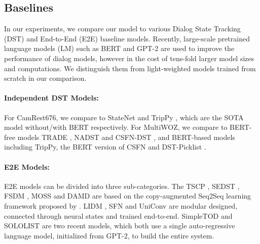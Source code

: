 \documentclass[11pt,a4paper]{article}
\begin{document}
\subsection{Baselines}
In our experiments, we compare our model to various Dialog State Tracking (DST) and End-to-End (E2E) baseline models. 
	Recently, large-scale pretrained language models (LM) such as BERT \cite{devlin2019bert} and GPT-2 \cite{radford2019gpt2} are used to improve the performance of dialog models, however in the cost of tens-fold larger model sizes and computations. We distinguish them from light-weighted models trained from scratch in our comparison. 
	
	\paragraph{Independent DST Models:}
	For CamRest676, we compare to StateNet \cite{ren2018towards} and TripPy \cite{heck2020trippy}, which are the SOTA model without/with BERT respectively. For MultiWOZ, we compare to BERT-free models TRADE \cite{wu2019transferable}, NADST \cite{le2020nadst} and CSFN-DST \cite{zhu2020efficient}, and BERT-based models including TripPy, the BERT version of CSFN and DST-Picklist \cite{zhang2019find}. 
	
	\paragraph{E2E Models:} E2E models can be divided into three sub-categories. The TSCP \cite{lei2018sequicity}, SEDST \cite{sedst}, FSDM \cite{fsdm}, MOSS \cite{liang2020moss} and DAMD \cite{zhang2020task} are based on the copy-augmented Seq2Seq learning framework proposed by \citet{lei2018sequicity}. LIDM \cite{wen2017latent}, SFN \cite{mehri2019structured} and UniConv \cite{le2020uniconv} are modular designed, connected through neural states and trained end-to-end. SimpleTOD \cite{hosseini2020simple} and SOLOLIST \cite{peng2020soloist} are two recent models, which both use a single auto-regressive language model, initialized from GPT-2, to build the entire system. 
	
\end{document}
